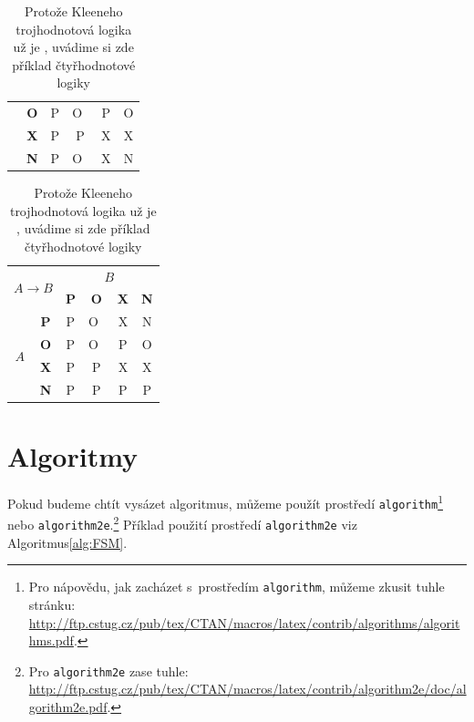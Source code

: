 \documentclass[11pt]{article}
\begin{document}
\begin{table}[ht]
\begin{tabular}{|c|c|c|c|c|c|}
                                & \textbf{O}    & P & O~& P & O\\ \cline{2-6} 
                                & \textbf{X}    & P & P & X & X\\ \cline{2-6} 
                                & \textbf{N}    & P & O~& X & N\\ \hline
    \end{tabular}
    \begin{tabular}{|c|c|c|c|c|c|} \hline
         \multicolumn{2}{|c|}{\multirow{2}{*}{$A \rightarrow B$}} & \multicolumn{4}{c|}{$B$}\\ \cline{3-6}
         \multicolumn{2}{|c|}{} & \textbf{P} & \textbf{O} & \textbf{X} & \textbf{N} \\ \hline
         \multirow{4}{*}{$A$}   & \textbf{P}    & P & O~& X & N\\ \cline{2-6} 
                                & \textbf{O}    & P & O~& P & O\\ \cline{2-6} 
                                & \textbf{X}    & P & P & X & X\\ \cline{2-6} 
                                & \textbf{N}    & P & P & P & P\\ \hline
    \end{tabular}
    \caption{Protože Kleeneho trojhodnotová logika už je , uvádime si zde příklad čtyřhodnotové logiky}
    \label{tab:kleen}
\end{table}

\bigskip \pagebreak


\section{Algoritmy} \label{Algoritmy}
Pokud budeme chtít vysázet algoritmus, můžeme použít prostředí \texttt{algorithm}\footnote{
Pro nápovědu, jak zacházet s~prostředím \texttt{algorithm}, můžeme zkusit tuhle stránku:\\
\href{http://ftp.cstug.cz/pub/tex/CTAN/macros/latex/contrib/algorithms/algorithms.pdf}{http://ftp.cstug.cz/pub/tex/CTAN/macros/latex/contrib/algorithms/algorithms.pdf}.
} nebo \texttt{algorithm2e}.\footnote{
Pro \texttt{algorithm2e} zase tuhle: 
\href{http://ftp.cstug.cz/pub/tex/CTAN/macros/latex/contrib/algorithm2e/doc/algorithm2e.pdf}{http://ftp.cstug.cz/pub/tex/CTAN/macros/latex/contrib/algorithm2e/doc/algorithm2e.pdf}.
} Příklad použití prostředí \texttt{algorithm2e} viz Algoritmus\ref{alg:FSM}.
\end{document}
